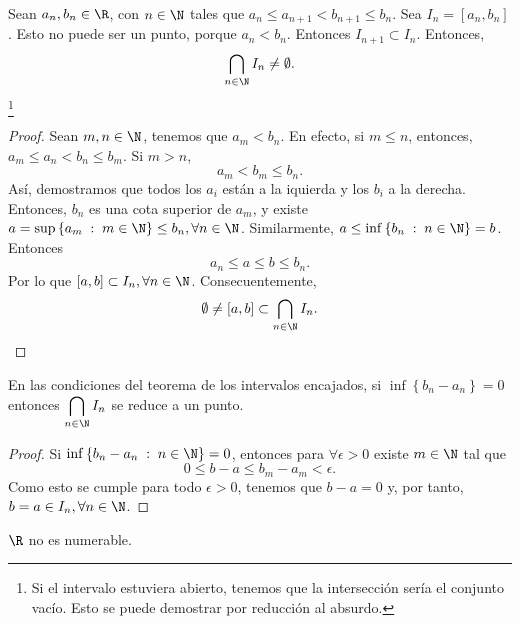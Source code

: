 \begin{ftheorem}
	\normalfont Sean $\displaystyle a_{n}, b_{n} \in \R $, con $\displaystyle n \in \N $ tales que $\displaystyle a_{n}\leq a_{n+1} < b_{n+1} \leq b_{n}$. Sea $\displaystyle I_{n} = \left[a_{n}, b_{n}\right]  $. Esto no puede ser un punto, porque $\displaystyle a_{n} < b_{n} $. Entonces $\displaystyle I_{n+1}\subset I_{n} $. Entonces, 
	\[\bigcap_{n \in \N} I_{n} \neq \emptyset .\]
\footnote{Si el intervalo estuviera abierto, tenemos que la intersección sería el conjunto vacío. Esto se puede demostrar por reducción al absurdo.} 
\end{ftheorem}

\begin{proof}
Sean $\displaystyle m,n \in \N $, tenemos que $\displaystyle a_{m} < b_{n} $. En efecto, si $\displaystyle m \leq n $, entonces, $\displaystyle a_{m} \leq a_{n} < b_{n} \leq b_{m}$. Si $\displaystyle m > n $, 
\[a_{m} < b_{m} \leq b_{n}.\]
Así, demostramos que todos los $\displaystyle a_{i} $ están a la iquierda y los $\displaystyle b_{i} $ a la derecha. Entonces, $\displaystyle b_{n} $ es una cota superior de $\displaystyle a_{m} $, y existe $\displaystyle a = \sup \left\{ a_{m} \; : \; m \in \N\right\} \leq b_{n}, \forall n \in \N $. Similarmente, $\displaystyle a \leq \inf \left\{ b_{n} \; : \; n\in \N\right\} = b $. Entonces
\[a_{n}\leq a \leq b \leq b_{n} .\]
Por lo que $\displaystyle [a,b] \subset I_{n}, \forall n \in \N $. Consecuentemente, 
\[\emptyset \neq [a,b] \subset \bigcap_{n \in \N} I _{n} .\]
\end{proof}

\begin{fcolorary}[]
	\normalfont En las condiciones del teorema de los intervalos encajados, si $\displaystyle \inf \left\{ b_{n}-a_{n}\right\} =0 $ entonces $\displaystyle \bigcap_{n \in \N} I _{n} $ se reduce a un punto.
\end{fcolorary}

\begin{proof}
	Si $\displaystyle \inf \left\{ b_{n}-a_{n} \; : \; n \in \N\right\} = 0 $, entonces para $\displaystyle \forall \epsilon > 0 $ existe $\displaystyle m \in \N $ tal que 
	\[0 \leq b - a \leq b_{m}-a_{m} < \epsilon .\]
Como esto se cumple para todo $\displaystyle \epsilon > 0 $, tenemos que $\displaystyle b - a = 0 $ y, por tanto, $\displaystyle b = a \in I_{n}, \forall n \in \N$. 
\end{proof}

\begin{ftheorem}[]
\normalfont $\displaystyle \R $ no es numerable. 
\end{ftheorem}

